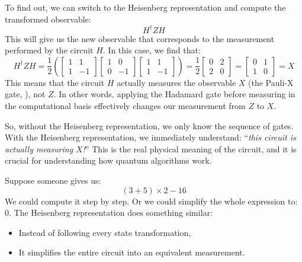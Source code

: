 \highspace
To find out, we can switch to the Heisenberg representation and compute the transformed observable:
\begin{equation*}
    H^\dagger Z H
\end{equation*}
This will give us the new observable that corresponds to the measurement performed by the circuit $H$. In this case, we find that:
\begin{equation*}
    H^\dagger Z H =
    \dfrac{1}{2} \left(
        \begin{bmatrix}
            1 & 1 \\
            1 & -1
        \end{bmatrix}
        \begin{bmatrix}
            1 & 0 \\
            0 & -1
        \end{bmatrix}
        \begin{bmatrix}
            1 & 1 \\
            1 & -1
        \end{bmatrix}
    \right) =
    \dfrac{1}{2}
    \begin{bmatrix}
        0 & 2 \\
        2 & 0
    \end{bmatrix} =
    \begin{bmatrix}
        0 & 1 \\
        1 & 0
    \end{bmatrix} = X
\end{equation*}
This means that the circuit $H$ actually measures the observable $X$ (the Pauli-X gate, ), not $Z$. In other words, applying the Hadamard gate before measuring in the computational basis effectively changes our measurement from $Z$ to $X$.

\highspace
So, without the Heisenberg representation, we only know the sequence of gates. With the Heisenberg representation, we immediately understand: ``\emph{this circuit is actually measuring $X$!}'' This is the real physical meaning of the circuit, and it is crucial for understanding how quantum algorithms work.

\begin{examplebox}
    Suppose someone gives us:
    \begin{equation*}
        \left(3 + 5\right) \times 2 - 16
    \end{equation*}
    We could compute it step by step. Or we could simplify the whole expression to: $0$. The Heisenberg representation does something similar:
    \begin{itemize}
        \item Instead of following every state transformation,
        \item It simplifies the entire circuit into an equivalent measurement.
    \end{itemize}
\end{examplebox}

